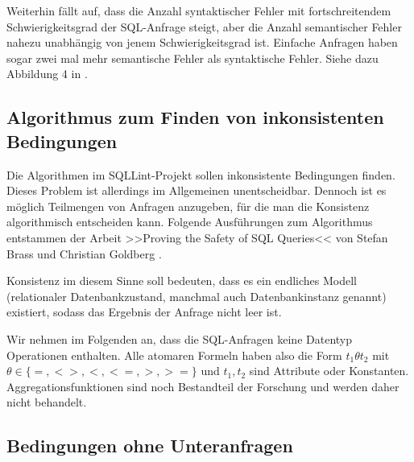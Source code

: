 Weiterhin fällt auf, dass die Anzahl syntaktischer Fehler mit fortschreitendem Schwierigkeitsgrad der SQL-Anfrage steigt, aber die Anzahl semantischer Fehler nahezu unabhängig von jenem Schwierigkeitsgrad ist. Einfache Anfragen haben sogar zwei mal mehr semantische Fehler als syntaktische Fehler. Siehe dazu Abbildung 4 in \cite{sqllint1}.

\subsection{Algorithmus zum Finden von inkonsistenten Bedingungen}

Die Algorithmen im SQLLint-Projekt sollen inkonsistente Bedingungen finden. Dieses Problem ist allerdings im Allgemeinen unentscheidbar. Dennoch ist es möglich Teilmengen von Anfragen anzugeben, für die man die Konsistenz algorithmisch entscheiden kann. Folgende Ausführungen zum Algorithmus entstammen der Arbeit >>Proving the Safety of SQL Queries<< von Stefan Brass und Christian Goldberg \cite{brass1}.

Konsistenz im diesem Sinne soll bedeuten, dass es ein endliches Modell (relationaler Datenbankzustand, manchmal auch Datenbankinstanz genannt) existiert, sodass das Ergebnis der Anfrage nicht leer ist.

Wir nehmen im Folgenden an, dass die SQL-Anfragen keine Datentyp Operationen enthalten. Alle atomaren Formeln haben also die Form $t_1\theta t_2$ mit $\theta\in \{=,<>,<,<=,>,>=\}$ und $t_1,t_2$ sind Attribute oder Konstanten. Aggregationsfunktionen sind noch Bestandteil der Forschung und werden daher nicht behandelt.

\subsection{Bedingungen ohne Unteranfragen}

